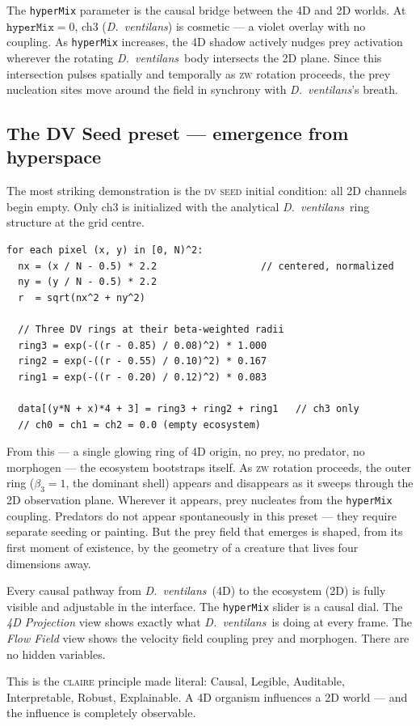 \documentclass[11pt,a4paper]{article}
\newcommand{\spc}[1]{\textit{#1}}  %
\newcommand{\DV}{\spc{D.\ ventilans}}
\begin{document}
The \texttt{hyperMix} parameter is the causal bridge between the 4D and 2D
worlds. At $\texttt{hyperMix}=0$, ch3 (\DV) is cosmetic --- a violet
overlay with no coupling. As \texttt{hyperMix} increases, the 4D shadow
actively nudges prey activation wherever the rotating \DV\ body intersects
the 2D plane. Since this intersection pulses spatially and temporally as
\textsc{zw} rotation proceeds, the prey nucleation sites move around the
field in synchrony with \DV's breath.

\subsection{The DV Seed preset --- emergence from hyperspace}

The most striking demonstration is the \textsc{dv seed} initial condition:
all 2D channels begin empty. Only ch3 is initialized with the analytical
\DV\ ring structure at the grid centre.

\begin{lstlisting}[language=pseudo, caption={\textsc{dv seed} initial condition (\texttt{buildEcosystem('hyperseed')}). Only ch3 (alpha) receives non-zero values; the rest of the ecosystem bootstraps from the $\beta_{3}$ ring.}]
for each pixel (x, y) in [0, N)^2:
  nx = (x / N - 0.5) * 2.2                  // centered, normalized
  ny = (y / N - 0.5) * 2.2
  r  = sqrt(nx^2 + ny^2)

  // Three DV rings at their beta-weighted radii
  ring3 = exp(-((r - 0.85) / 0.08)^2) * 1.000
  ring2 = exp(-((r - 0.55) / 0.10)^2) * 0.167
  ring1 = exp(-((r - 0.20) / 0.12)^2) * 0.083

  data[(y*N + x)*4 + 3] = ring3 + ring2 + ring1   // ch3 only
  // ch0 = ch1 = ch2 = 0.0 (empty ecosystem)
\end{lstlisting}

From this --- a single glowing ring of 4D origin, no prey, no predator,
no morphogen --- the ecosystem bootstraps itself. As \textsc{zw} rotation
proceeds, the outer ring ($\beta_{3}=1$, the dominant shell) appears and
disappears as it sweeps through the 2D observation plane. Wherever it
appears, prey nucleates from the \texttt{hyperMix} coupling. Predators do
not appear spontaneously in this preset --- they require separate seeding
or painting. But the prey field that emerges is shaped, from its first
moment of existence, by the geometry of a creature that lives four
dimensions away.

\begin{callout}
Every causal pathway from \DV\ (4D) to the ecosystem (2D) is fully visible
and adjustable in the interface. The \texttt{hyperMix} slider is a causal
dial. The \textit{4D Projection} view shows exactly what \DV\ is doing at
every frame. The \textit{Flow Field} view shows the velocity field
coupling prey and morphogen. There are no hidden variables.

This is the \textsc{claire} principle made literal: Causal, Legible,
Auditable, Interpretable, Robust, Explainable. A 4D organism influences
a 2D world --- and the influence is completely observable.
\end{callout}
\end{document}
